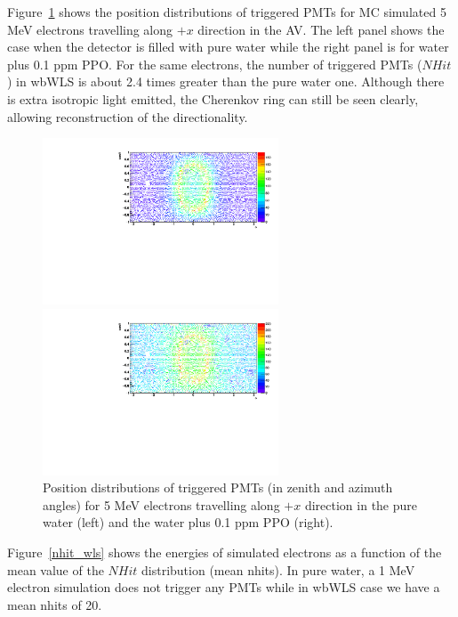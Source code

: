 Figure~\ref{pmt_wls} shows the position distributions of triggered PMTs for MC simulated 5 MeV electrons travelling along $+x$ direction in the AV. The left panel shows the case when the detector is filled with pure water while the right panel is for water plus 0.1 ppm PPO. For the same electrons, the number of triggered PMTs ($NHit$) in wbWLS is about 2.4 times greater than the pure water one. Although there is extra isotropic light emitted, the Cherenkov ring can still be seen clearly, allowing reconstruction of the directionality.  

\begin{figure}[htbp]
	\centering
	\begin{minipage}[t]{0.48\textwidth}
		\centering
		\includegraphics[width=7cm]{PMT_5MeVElectronWater.pdf}
	\end{minipage}
	\begin{minipage}[t]{0.48\textwidth}
		\centering
		\includegraphics[width=7cm]{PMT_5MeVElectron0p1ppmPPO.pdf}
	\end{minipage}
	\caption{Position distributions of triggered PMTs (in zenith and azimuth angles) for 5 MeV electrons travelling along $+x$ direction in the pure water (left) and the water plus 0.1 ppm PPO (right).}
	\label{pmt_wls}
\end{figure}

Figure~\ref{nhit_wls} shows the energies of simulated electrons as a function of the mean value of the $NHit$ distribution (mean nhits). In pure water, a 1 MeV electron simulation does not trigger any PMTs while in wbWLS case we have a mean nhits of 20.

